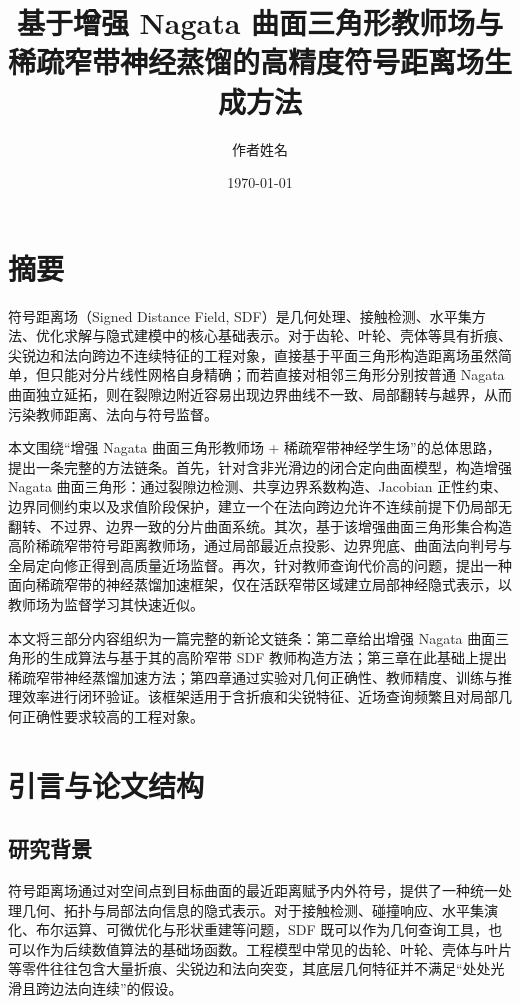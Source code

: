 \documentclass[12pt,oneside]{ctexbook}
\title{基于增强 Nagata 曲面三角形教师场与稀疏窄带神经蒸馏的高精度符号距离场生成方法}
\author{作者姓名}
\date{\today}
\begin{document}
\frontmatter
\maketitle

\chapter*{摘要}
符号距离场（Signed Distance Field, SDF）是几何处理、接触检测、水平集方法、优化求解与隐式建模中的核心基础表示。对于齿轮、叶轮、壳体等具有折痕、尖锐边和法向跨边不连续特征的工程对象，直接基于平面三角形构造距离场虽然简单，但只能对分片线性网格自身精确；而若直接对相邻三角形分别按普通 Nagata 曲面独立延拓，则在裂隙边附近容易出现边界曲线不一致、局部翻转与越界，从而污染教师距离、法向与符号监督。

本文围绕“增强 Nagata 曲面三角形教师场 + 稀疏窄带神经学生场”的总体思路，提出一条完整的方法链条。首先，针对含非光滑边的闭合定向曲面模型，构造增强 Nagata 曲面三角形：通过裂隙边检测、共享边界系数构造、Jacobian 正性约束、边界同侧约束以及求值阶段保护，建立一个在法向跨边允许不连续前提下仍局部无翻转、不过界、边界一致的分片曲面系统。其次，基于该增强曲面三角形集合构造高阶稀疏窄带符号距离教师场，通过局部最近点投影、边界兜底、曲面法向判号与全局定向修正得到高质量近场监督。再次，针对教师查询代价高的问题，提出一种面向稀疏窄带的神经蒸馏加速框架，仅在活跃窄带区域建立局部神经隐式表示，以教师场为监督学习其快速近似。

本文将三部分内容组织为一篇完整的新论文链条：第二章给出增强 Nagata 曲面三角形的生成算法与基于其的高阶窄带 SDF 教师构造方法；第三章在此基础上提出稀疏窄带神经蒸馏加速方法；第四章通过实验对几何正确性、教师精度、训练与推理效率进行闭环验证。该框架适用于含折痕和尖锐特征、近场查询频繁且对局部几何正确性要求较高的工程对象。
\tableofcontents

\mainmatter

\chapter{引言与论文结构}
\section{研究背景}
符号距离场通过对空间点到目标曲面的最近距离赋予内外符号，提供了一种统一处理几何、拓扑与局部法向信息的隐式表示。对于接触检测、碰撞响应、水平集演化、布尔运算、可微优化与形状重建等问题，SDF 既可以作为几何查询工具，也可以作为后续数值算法的基础场函数。工程模型中常见的齿轮、叶轮、壳体与叶片等零件往往包含大量折痕、尖锐边和法向突变，其底层几何特征并不满足“处处光滑且跨边法向连续”的假设。
\end{document}
